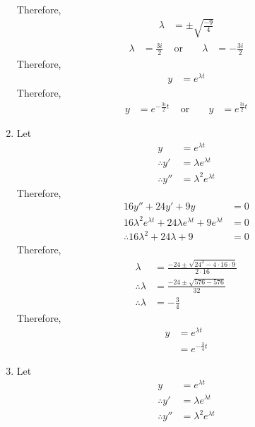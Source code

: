 \documentclass[fleqn, a4paper, 11pt, oneside]{amsart}
\theoremstyle{definition}
\theoremstyle{theorem}
\begin{document}
\begin{solution}
\begin{enumerate}[leftmargin = *]
\begin{align*}
			\end{align*}
			Therefore,
			\begin{align*}
				\lambda & = \pm \sqrt{\frac{-9}{4}}
			\end{align*}
			\begin{align*}
				\lambda & = \frac{3 i}{2} & \text{ or } &  & \lambda & = -\frac{3 i}{2}
			\end{align*}
			Therefore,
			\begin{align*}
				y & = e^{\lambda t}
			\end{align*} 
			Therefore,
			\begin{align*}
				y & = e^{-\frac{3 i}{2} t} & \text{ or } &  & y & = e^{\frac{3 i}{2} t}
			\end{align*}
		\item
			Let
			\begin{align*}
				y              & = e^{\lambda t}         \\
				\therefore y'  & = \lambda e^{\lambda t} \\
				\therefore y'' & = \lambda^2 e^{\lambda t}
			\end{align*}
			Therefore,
			\begin{align*}
				16y'' + 24 y' + 9 y                                                     & = 0 \\
				16 \lambda^2 e^{\lambda t} + 24 \lambda e^{\lambda t} + 9 e^{\lambda t} & = 0 \\
				\therefore 16 \lambda^2 + 24 \lambda + 9                                & = 0
			\end{align*}
			Therefore,
			\begin{align*}
				\lambda            & = \frac{-24 \pm \sqrt{24^2 - 4 \cdot 16 \cdot 9}}{2 \cdot 16} \\
				\therefore \lambda & = \frac{-24 \pm \sqrt{576 - 576}}{32}                         \\
				\therefore \lambda & = -\frac{3}{4}
			\end{align*}
			Therefore,
			\begin{align*}
				y & = e^{\lambda t} \\
                                  & = e^{-\frac{3}{4} t}
			\end{align*}
		\item
			Let
			\begin{align*}
				y               & = e^{\lambda t}           \\
				\therefore y'   & = \lambda e^{\lambda t}   \\
				\therefore y''  & = \lambda^2 e^{\lambda t} \\

\end{align*}
\end{enumerate}
\end{solution}
\end{document}
